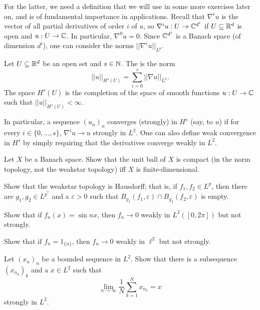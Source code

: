 For the latter, we need a definition that we will use in some more exercises later on, and is of fundamental importance in applications.
Recall that $\nabla^iu$ is the vector of all partial derivatives of order $i$ of $u$, so $\nabla^iu: U \to \mathbb{C}^{d^i}$ if $U \subseteq \mathbb{R}^d$ is open and $u: U \to \mathbb{C}$.
In particular, $\nabla^0u = 0$.
Since $\mathbb{C}^{d^i}$ is a Banach space (of dimension $d^i$), one can consider the norms $||\nabla^iu||_{L^p}$.

\begin{definition}
Let $U \subseteq \mathbb{R}^d$ be an open set and $s \in \mathbb{N}$.
The  is the norm
\[||u||_{H^s(U)} = \sum_{i=0}^{s} ||\nabla u||_{L^2}.\]
The space $H^s(U)$ is the completion of the space of smooth functions $u: U \to \mathbb{C}$ such that $||u||_{H^s(U)} < \infty$.
\end{definition}
In particular, a sequence $(u_{n})_{n}$ converges (strongly) in $H^s$ (say, to $u$) if for every $i \in \{0, \dots, s\}$, $\nabla^iu \to u$ strongly in $L^2$.
One can also define weak convergence in $H^s$ by simply requiring that the derivatives converge weakly in $L^2$.

\begin{exercise}
\label{unit ball compactness}
Let $X$ be a Banach space. Show that the unit ball of $X$ is compact (in the norm topology, not the weakstar topology) iff $X$ is finite-dimensional.
\end{exercise}

\begin{exercise}
\label{weakstar is hausdorff}
Show that the weakstar topology is Hausdorff; that is, if $f_1, f_2 \in L^p$, then there are $g_1, g_2 \in L^{p^*}$ and a $\varepsilon > 0$ such that $B_{g_1}(f_1, \varepsilon) \cap B_{g_2}(f_2, \varepsilon)$ is empty.
\end{exercise}

\begin{exercise}
Show that if $f_{n}(x) = \sin nx$, then $f_{n} \to 0$ weakly in $L^2([0, 2\pi])$ but not strongly.
\end{exercise}

\begin{exercise}
Show that if $f_{n} = 1_{\{n\}}$, then $f_{n} \to 0$ weakly in $\ell^2$ but not strongly.
\end{exercise}

\begin{exercise}
Let $(x_{n})_{n}$ be a bounded sequence in $L^2$. Show that there is a subsequence $(x_{n_{k}})_{k}$ and a $x \in L^2$ such that
\[\lim_{n \to \infty} \frac{1}{N} \sum_{k=1}^{N} x_{n_{k}} = x\]
strongly in $L^2$.
\end{exercise}

